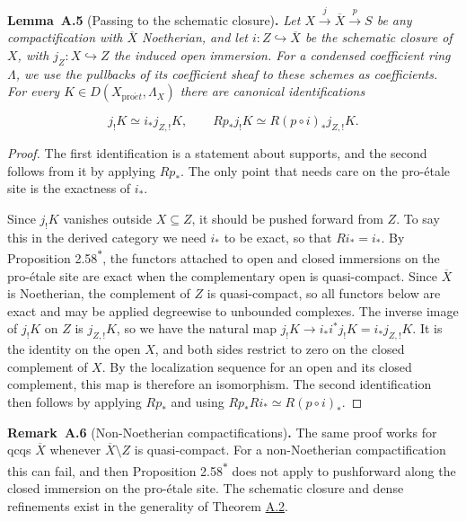 \documentclass[11pt]{article}
\newenvironment{bpstatement}[2]{\par\addvspace{0.6\baselineskip}\noindent\textbf{#1}#2\textbf{.}\enspace\ignorespaces}
  {\par\addvspace{0.4\baselineskip}}
\newenvironment{bpstatementit}[2]{\begin{bpstatement}{#1}{#2}\itshape\ignorespaces}{\end{bpstatement}}
\newcommand{\bpout}[1]{#1\textsuperscript{\hyperlink{bp-outside}{\ensuremath{\ast}}}}
\begin{document}
\label{bp17}%
\begin{bpstatementit}{Lemma~A.5}{ (Passing to the schematic closure)}
Let \(X\xrightarrow{j}\overline X\xrightarrow{p}S\) be any compactification with \(\overline X\) Noetherian, and let \(i:Z\hookrightarrow\overline X\) be the schematic closure of \(X\), with \(j_Z:X\hookrightarrow Z\) the induced open immersion. For a condensed coefficient ring \(\Lambda\), we use the pullbacks of its coefficient sheaf to these schemes as coefficients. For every \(K\in D(X_{\mathrm{pro}\acute{e}t},\Lambda_X)\) there are canonical identifications

\[
j_!K\simeq i_*j_{Z,!}K,\qquad
Rp_*j_!K\simeq R(p\circ i)_*j_{Z,!}K.
\]
\end{bpstatementit}

\begin{proof}[{Proof}]\label{bp18}%
The first identification is a statement about supports, and the second follows from it by applying \(Rp_*\). The only point that needs care on the pro-étale site is the exactness of \(i_*\).

Since \(j_!K\) vanishes outside \(X\subseteq Z\), it should be pushed forward from \(Z\). To say this in the derived category we need \(i_*\) to be exact, so that \(Ri_*=i_*\). By Proposition \bpout{2.58}, the functors attached to open and closed immersions on the pro-étale site are exact when the complementary open is quasi-compact. Since \(\overline X\) is Noetherian, the complement of \(Z\) is quasi-compact, so all functors below are exact and may be applied degreewise to unbounded complexes. The inverse image of \(j_!K\) on \(Z\) is \(j_{Z,!}K\), so we have the natural map \(j_!K\to i_*i^*j_!K=i_*j_{Z,!}K\). It is the identity on the open \(X\), and both sides restrict to zero on the closed complement of \(X\). By the localization sequence for an open and its closed complement, this map is therefore an isomorphism. The second identification then follows by applying \(Rp_*\) and using \(Rp_*Ri_*\simeq R(p\circ i)_*\).
\end{proof}

\label{bp19}%
\begin{bpstatement}{Remark~A.6}{ (Non-Noetherian compactifications)}
The same proof works for qcqs \(\overline X\) whenever \(\overline X\setminus Z\) is quasi-compact. For a non-Noetherian compactification this can fail, and then Proposition \bpout{2.58} does not apply to pushforward along the closed immersion on the pro-étale site. The schematic closure and dense refinements exist in the generality of Theorem \hyperref[bp9]{A.2}.
\end{bpstatement}
\end{document}

